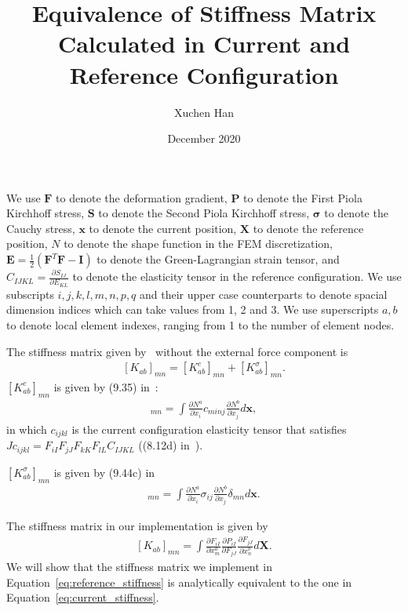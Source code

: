 \documentclass[a4paper]{article}
\title{Equivalence of Stiffness Matrix Calculated in Current and Reference
Configuration}
\author{Xuchen Han}
\date{December 2020}
\newcommand{\mb}[1]{{\mathbf{#1}}}
\newcommand{\EE}{\mb{E}}
\newcommand{\FF}{\mb{F}}
\newcommand{\II}{\mb{I}}
\newcommand{\PP}{\mb{P}}
\renewcommand{\SS}{\mb{S}}
\newcommand{\XX}{\mb{X}}
\newcommand{\xx}{\mb{x}}
\newcommand{\ssigma}{\boldsymbol{\sigma}}
\begin{document}
\maketitle

We use $\FF$ to denote the deformation gradient, $\PP$ to denote the
First Piola
Kirchhoff stress, $\SS$ to denote the Second Piola Kirchhoff stress,
$\ssigma$
to denote the Cauchy stress, $\xx$ to denote the current position, $\XX$
to denote the reference position, $N$ to denote the shape function in the
FEM discretization, $\EE = \frac{1}{2}(\FF^T \FF - \II)$ to denote the
Green-Lagrangian strain tensor, and $C_{IJKL} = \frac{\partial
    S_{IJ}}{\partial E_{KL}}$ to denote the elasticity tensor in the
reference configuration. We use subscripts $i, j, k, l, m, n, p, q$ and
their upper case counterparts to denote spacial dimension indices which
can take values from 1, 2 and 3. We use superscripts $a, b$ to denote
local element indexes, ranging from 1 to the number of element nodes.

The stiffness matrix given by~\cite{Bonet} without the external force
component is
\begin{align}
    \label{eq:current_stiffness}
    [K_{ab}]_{mn} = [K^c_{ab}]_{mn} + [K^\sigma_{ab}]_{mn}.
\end{align}
$[K^c_{ab}]_{mn}$ is given by (9.35) in~\cite{Bonet}:
\begin{align*}
[K^c_{ab}]
    _{mn} = \int \frac{\partial N^a}{\partial x_i} c_{minj}
    \frac{\partial N^b}{\partial x_j}d\xx,
\end{align*}
in which $c_{ijkl}$ is the current configuration elasticity tensor that
satisfies $J c_{ijkl} = F_{iI}F_{jJ}F_{kK}F_{lL}C_{IJKL}$ ((8.12d)
in~\cite{Bonet}).

$[K^{\sigma}_{ab}]_{mn}$ is given by (9.44c) in~\cite{Bonet}
\begin{align*}
[K^\sigma_{ab}]
    _{mn} = \int \frac{\partial N^a}{\partial x_i} \sigma_{ij}
    \frac{\partial N^b}{\partial x_j} \delta_{mn} d\xx.
\end{align*}

The stiffness matrix in our implementation is given by
\begin{align}
    \label{eq:reference_stiffness}
    [K_{ab}]_{mn} = \int \frac{\partial F_{iI}}{\partial x^a_m}
    \frac{\partial P_{iI}}{\partial F_{jJ}} \frac{\partial
        F_{jJ}}{\partial x^b_n} d\XX.
\end{align}
We will show that the stiffness matrix we implement in
Equation~\ref{eq:reference_stiffness} is analytically equivalent to the
one in Equation~\ref{eq:current_stiffness}.
\end{document}
